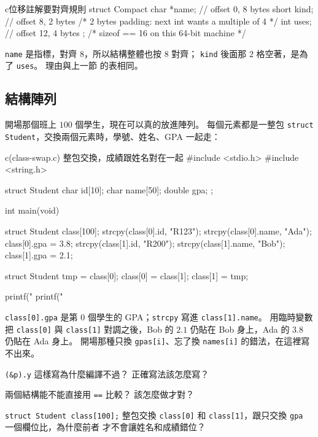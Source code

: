 \begin{code}{c}{位移註解要對齊規則}
struct Compact {
    char *name;   // offset 0, 8 bytes
    short kind;   // offset 8, 2 bytes
    /* 2 bytes padding: next int wants a multiple of 4 */
    int uses;     // offset 12, 4 bytes
};
/* sizeof == 16 on this 64-bit machine */
\end{code}

\texttt{name} 是指標，對齊 $8$，所以結構整體也按 $8$ 對齊；
\texttt{kind} 後面那 $2$ 格空著，是為了 \texttt{uses}。 理由與上一節
的表相同。

\subsection{結構陣列}

開場那個班上 $100$ 個學生，現在可以真的放進陣列。 每個元素都是一整包
\texttt{struct Student}，交換兩個元素時，學號、姓名、GPA 一起走：

\begin{example}{c}{(class-swap.c) 整包交換，成績跟姓名對在一起}
#include <stdio.h>
#include <string.h>

struct Student {
    char id[10];
    char name[50];
    double gpa;
};

int main(void) {
    struct Student class[100];
    strcpy(class[0].id, "R123");
    strcpy(class[0].name, "Ada");
    class[0].gpa = 3.8;
    strcpy(class[1].id, "R200");
    strcpy(class[1].name, "Bob");
    class[1].gpa = 2.1;

    struct Student tmp = class[0];
    class[0] = class[1];
    class[1] = tmp;

    printf("%
    printf("%
}
\end{example}


\texttt{class[0].gpa} 是第 $0$ 個學生的 GPA；\texttt{strcpy} 寫進
\texttt{class[1].name}。 用臨時變數把 \texttt{class[0]} 與
\texttt{class[1]} 對調之後，Bob 的 $2.1$ 仍貼在 Bob 身上，Ada 的
$3.8$ 仍貼在 Ada 身上。 開場那種只換 \texttt{gpas[i]}、忘了換
\texttt{names[i]} 的錯法，在這裡寫不出來。

\begin{drills}[label=drills:struct-access]
\item \texttt{(\&p).y} 這樣寫為什麼編譯不過？ 正確寫法該怎麼寫？
\item 兩個結構能不能直接用 \texttt{==} 比較？ 該怎麼做才對？
\item \texttt{struct Student class[100];} 整包交換 \texttt{class[0]}
和 \texttt{class[1]}，跟只交換 \texttt{gpa} 一個欄位比，為什麼前者
才不會讓姓名和成績錯位？
\end{drills}

